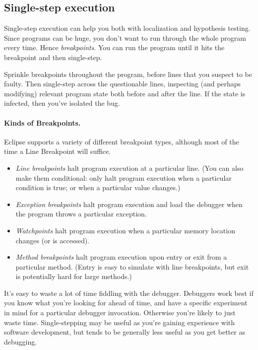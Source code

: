 \subsection*{Single-step execution}
Single-step execution can help you both with localization and
hypothesis testing.  Since programs can be huge, you don't want to run
through the whole program every time. Hence \emph{breakpoints}. You
can run the program until it hits the breakpoint and then
single-step. 

Sprinkle breakpoints throughout the program, before lines that you
suspect to be faulty. Then single-step across the questionable lines, inspecting
(and perhaps modifying) relevant program state both before and after
the line. If the state is infected, then you've isolated the bug.

\paragraph{Kinds of Breakpoints.} Eclipse supports a variety of different breakpoint
types\cite{eclipse:bp}, 
although most of the time a Line Breakpoint will suffice.

\begin{itemize}
\item \emph{Line breakpoints} halt program execution at a particular line. (You can also 
make them conditional: only halt program execution when a particular condition is true;
or when a particular value changes.)
\item \emph{Exception breakpoints} halt program execution and load the debugger when
the program throws a particular exception.
\item \emph{Watchpoints} halt program execution when a particular memory location changes
(or is accessed).
\item \emph{Method breakpoints} halt program execution upon entry or exit from a particular
method. (Entry is easy to simulate with line breakpoints, but exit is potentially hard for
large methods.)
\end{itemize}

It's easy to waste a lot of time fiddling with the debugger. Debuggers
work best if you know what you're looking for ahead of time, and 
have a specific experiment in mind for a particular debugger invocation.
Otherwise you're likely to just waste time. Single-stepping may be useful
as you're gaining experience with software development, but tends to be
generally less useful as you get better as debugging.


